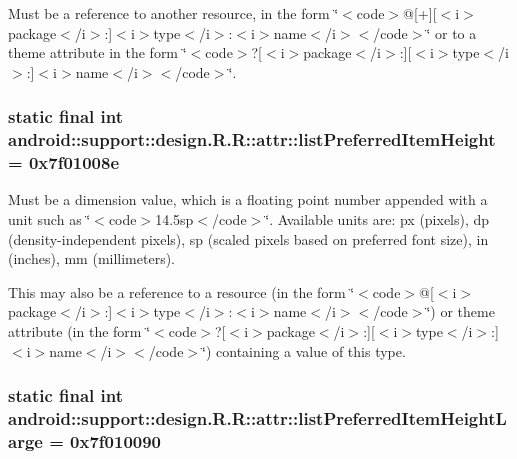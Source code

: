 Must be a reference to another resource, in the form \char`\"{}$<$code$>$@\mbox{[}+\mbox{]}\mbox{[}$<$i$>$package$<$/i$>$:\mbox{]}$<$i$>$type$<$/i$>$:$<$i$>$name$<$/i$>$$<$/code$>$\char`\"{} or to a theme attribute in the form \char`\"{}$<$code$>$?\mbox{[}$<$i$>$package$<$/i$>$:\mbox{]}\mbox{[}$<$i$>$type$<$/i$>$:\mbox{]}$<$i$>$name$<$/i$>$$<$/code$>$\char`\"{}. \hypertarget{classandroid_1_1support_1_1design_1_1_r_1_1attr_3e168435d130d4d40e2f2c8b6030320a}{
\subsubsection[{listPreferredItemHeight}]{\setlength{\rightskip}{0pt plus 5cm}static final int android::support::design.R.R::attr::listPreferredItemHeight = 0x7f01008e}}
\label{classandroid_1_1support_1_1design_1_1_r_1_1attr_3e168435d130d4d40e2f2c8b6030320a}


Must be a dimension value, which is a floating point number appended with a unit such as \char`\"{}$<$code$>$14.5sp$<$/code$>$\char`\"{}. Available units are: px (pixels), dp (density-independent pixels), sp (scaled pixels based on preferred font size), in (inches), mm (millimeters). 

This may also be a reference to a resource (in the form \char`\"{}$<$code$>$@\mbox{[}$<$i$>$package$<$/i$>$:\mbox{]}$<$i$>$type$<$/i$>$:$<$i$>$name$<$/i$>$$<$/code$>$\char`\"{}) or theme attribute (in the form \char`\"{}$<$code$>$?\mbox{[}$<$i$>$package$<$/i$>$:\mbox{]}\mbox{[}$<$i$>$type$<$/i$>$:\mbox{]}$<$i$>$name$<$/i$>$$<$/code$>$\char`\"{}) containing a value of this type. \hypertarget{classandroid_1_1support_1_1design_1_1_r_1_1attr_d9e76ed67eb71f49d414050fda6066b1}{
\subsubsection[{listPreferredItemHeightLarge}]{\setlength{\rightskip}{0pt plus 5cm}static final int android::support::design.R.R::attr::listPreferredItemHeightLarge = 0x7f010090}}
\label{classandroid_1_1support_1_1design_1_1_r_1_1attr_d9e76ed67eb71f49d414050fda6066b1}



